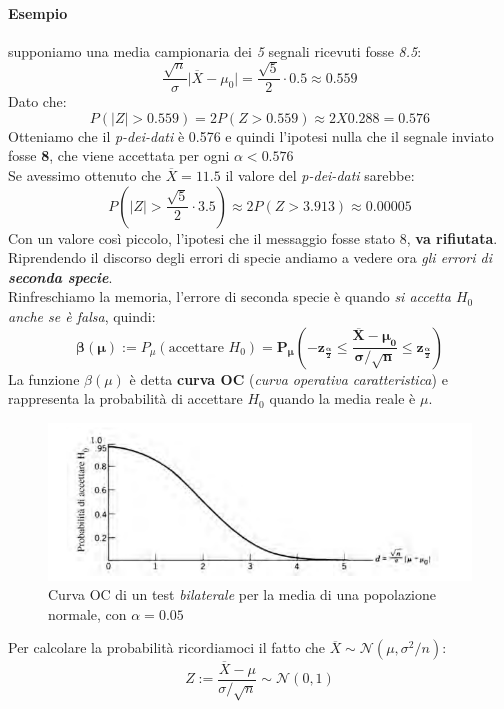 \documentclass[]{article}
\begin{document}
    \paragraph{Esempio} supponiamo una media campionaria dei \textit{5} segnali ricevuti fosse \textit{8.5}:
    \[ \frac{\sqrt{n}}{\sigma} \rvert \overline{X} - \mu_0 \rvert = \frac{\sqrt{5}}{2} \cdot 0.5 \approx 0.559 \]
    Dato che:
    \[ P(|Z| > 0.559) = 2P(Z > 0.559) \approx 2 X 0.288 = 0.576 \]
    Otteniamo che il \textit{p-dei-dati} è 0.576 e quindi l'ipotesi nulla che il segnale inviato fosse \textbf{8}, che viene accettata per ogni $\alpha < 0.576$ \\
    Se avessimo ottenuto che $\overline{X} = 11.5$ il valore del \textit{p-dei-dati} sarebbe:
    \[ P \left( |Z| > \frac{\sqrt{5}}{2} \cdot 3.5 \right) \approx 2P(Z > 3.913) \approx 0.00005 \]
    Con un valore così piccolo, l'ipotesi che il messaggio fosse stato 8, \textbf{va rifiutata}. \\[3ex]
    Riprendendo il discorso degli errori di specie andiamo a vedere ora \textit{gli errori di \textbf{seconda specie}}. \\
    Rinfreschiamo la memoria, l'errore di seconda specie è quando \textit{si accetta $H_0$ anche se è falsa}, quindi:
    \[ \boldsymbol{\beta(\mu)} := P_\mu (\text{accettare } H_0) = \boldsymbol{P_\mu \left( -z_{\frac{\alpha}{2}} \leq \frac{\overline{X} - \mu_0}{\sigma / \sqrt{n}} \leq z_{\frac{\alpha}{2}}\right)}\]
    La funzione $\beta(\mu)$ è detta \textbf{curva OC} (\textit{curva operativa caratteristica}) e rappresenta la probabilità di accettare $H_0$ quando la media reale è $\mu$.
    \begin{figure}[H]
        \includegraphics[width=\textwidth]{images/boh_6.png}
        \caption{Curva OC di un test \textit{bilaterale} per la media di una popolazione normale, con $\alpha = 0.05$}
    \end{figure}
    Per calcolare la probabilità ricordiamoci il fatto che $\overline{X} \sim \mathcal{N}(\mu, \sigma^2 / n)$:
    \[ Z := \frac{\overline{X} - \mu}{\sigma / \sqrt{n}} \sim \mathcal{N}(0,1) \]
\end{document}
